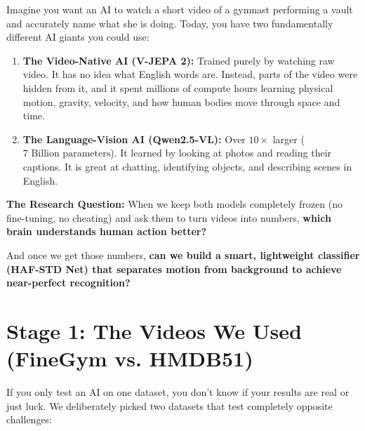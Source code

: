\documentclass[a4paper, 11pt]{article}
\begin{document}
\begin{conceptbox}
Imagine you want an AI to watch a short video of a gymnast performing a vault and accurately name what she is doing. Today, you have two fundamentally different AI giants you could use:
\begin{enumerate}
    \item \textbf{The Video-Native AI (V-JEPA 2):} Trained purely by watching raw video. It has no idea what English words are. Instead, parts of the video were hidden from it, and it spent millions of compute hours learning physical motion, gravity, velocity, and how human bodies move through space and time.
    \item \textbf{The Language-Vision AI (Qwen2.5-VL):} Over $10\times$ larger ($7\text{ Billion parameters}$). It learned by looking at photos and reading their captions. It is great at chatting, identifying objects, and describing scenes in English.
\end{enumerate}
\textbf{The Research Question:} When we keep both models completely frozen (no fine-tuning, no cheating) and ask them to turn videos into numbers, \textbf{which brain understands human action better?} 

And once we get those numbers, \textbf{can we build a smart, lightweight classifier (HAF-STD Net) that separates motion from background to achieve near-perfect recognition?}
\end{conceptbox}

\section{Stage 1: The Videos We Used (FineGym vs. HMDB51)}

\begin{conceptbox}
If you only test an AI on one dataset, you don't know if your results are real or just luck. We deliberately picked two datasets that test completely opposite challenges:
\end{conceptbox}
\end{document}
